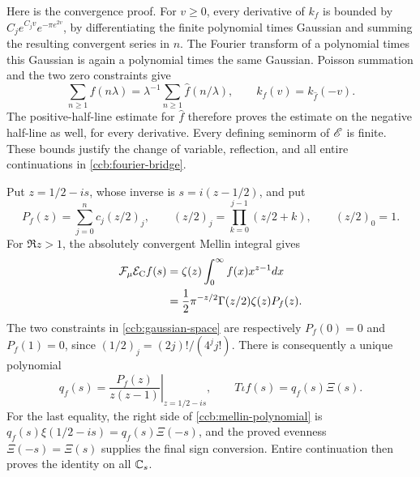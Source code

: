 Here is the convergence proof. For $v\geq0$, every derivative of $k_f$
is bounded by $C_j e^{C_jv}e^{-\pi e^{2v}}$, by differentiating the
finite polynomial times Gaussian and summing the resulting convergent
series in $n$. The Fourier transform of a polynomial times this Gaussian
is again a polynomial times the same Gaussian. Poisson summation and
the two zero constraints give
\[
 \sum_{n\geq1}f(n\lambda)
  =\lambda^{-1}\sum_{n\geq1}\widehat f(n/\lambda),\qquad
 k_f(v)=k_{\widehat f}(-v).
\]
The positive-half-line estimate for $\widehat f$ therefore proves the
estimate on the negative half-line as well, for every derivative.
Every defining seminorm of $\mathscr E$ is finite. These bounds justify the
change of variable, reflection, and all entire continuations in
\eqref{ccb:fourier-bridge}.

Put $z=1/2-is$, whose inverse is $s=i(z-1/2)$, and put
\[
 P_f(z)=\sum_{j=0}^n c_j(z/2)_j,\qquad
 (z/2)_j=\prod_{k=0}^{j-1}(z/2+k),\qquad (z/2)_0=1.
\]
For $\Re z>1$, the absolutely convergent Mellin integral gives
\begin{align}
 \mathcal F_\mu\mathcal E_{\rm C}f(s)
 &=\zeta(z)\int_0^\infty f(x)x^{z-1}dx\notag\\
 &=\frac12\pi^{-z/2}\Gamma(z/2)\zeta(z)P_f(z).
 \label{ccb:mellin-polynomial}
\end{align}
The two constraints in \eqref{ccb:gaussian-space} are respectively
$P_f(0)=0$ and $P_f(1)=0$, since $(1/2)_j=(2j)!/(4^j j!)$.
There is consequently a unique polynomial
\begin{equation}
 q_f(s)=\left.\frac{P_f(z)}{z(z-1)}\right|_{z=1/2-is},\qquad
 T\iota f(s)=q_f(s)\Xi(s).
 \label{ccb:qf}
\end{equation}
For the last equality, the right side of \eqref{ccb:mellin-polynomial}
is $q_f(s)\xi(1/2-is)=q_f(s)\Xi(-s)$, and the proved evenness
$\Xi(-s)=\Xi(s)$ supplies the final sign conversion. Entire continuation
then proves the identity on all $\mathbb C_s$.

